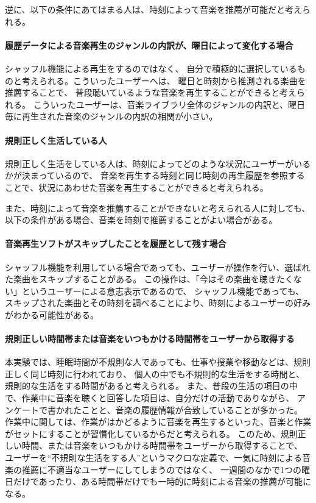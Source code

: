 \documentclass[11pt, onecolumn]{jsarticle}
\begin{document}
\vspace{\Cvs} 
\par
逆に、以下の条件にあてはまる人は、時刻によって音楽を推薦が可能だと考えられる。
\paragraph{履歴データによる音楽再生のジャンルの内訳が、曜日によって変化する場合}
シャッフル機能による再生をするのではなく、
自分で積極的に選択しているものと考えられる。こういったユーザーへは、
曜日と時刻から推測される楽曲を推薦することで、
普段聴いているような音楽を再生することができると考えられる。
こういったユーザーは、音楽ライブラリ全体のジャンルの内訳と、曜日毎に再生された音楽のジャンルの内訳の相関が小さい。
\paragraph{規則正しく生活している人}
規則正しく生活をしている人は、時刻によってどのような状況にユーザーがいるかが決まっているので、
音楽を再生する時刻と同じ時刻の再生履歴を参照することで、状況にあわせた音楽を再生することができると考えられる。

\vspace{\Cvs} 
また、時刻によって音楽を推薦することができないと考えられる人に対しても、以下の条件がある場合、音楽を時刻で推薦することがよい場合がある。

\paragraph{音楽再生ソフトがスキップしたことを履歴として残す場合}
シャッフル機能を利用している場合であっても、ユーザーが操作を行い、選ばれた楽曲をスキップすることがある。
この操作は、「今はその楽曲を聴きたくない」というユーザーによる意志表示であるので、
シャッフル機能であっても、スキップされた楽曲とその時刻を調べることにより、時刻によるユーザーの好みがわかる可能性がある。

\paragraph{規則正しい時間帯または音楽をいつもかける時間帯をユーザーから取得する}
本実験では、睡眠時間が不規則な人であっても、仕事や授業や移動などは、規則正しく同じ時刻に行われており、
個人の中でも不規則的な生活をする時間と、規則的な生活をする時間があると考えられる。
また、普段の生活の項目の中で、作業中に音楽を聴くと回答した項目は、自分だけの活動でありながら、
アンケートで書かれたことと、音楽の履歴情報が合致していることが多かった。
作業中に関しては、作業がはかどるように音楽を再生するといった、音楽と作業がセットにすることが習慣化しているからだと考えられる。
このため、規則正しい時間、または音楽をいつもかける時間帯をユーザーから取得することで、
ユーザーを``不規則な生活をする人''というマクロな定義で、一気に時刻による音楽の推薦に不適当なユーザーにしてしまうのではなく、
一週間のなかで1つの曜日だけであったり、ある時間帯だけでも一時的に時刻による音楽の推薦が可能になる。
\end{document}
